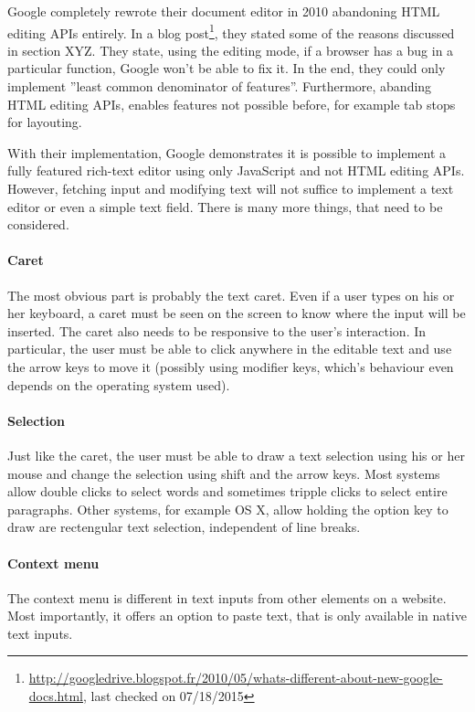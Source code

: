 Google completely rewrote their document editor in 2010 abandoning HTML editing APIs entirely. In a blog post\footnote{\url{http://googledrive.blogspot.fr/2010/05/whats-different-about-new-google-docs.html}, last checked on 07/18/2015}, they stated some of the reasons discussed in section XYZ. They state, using the editing mode, if a browser has a bug in a particular function, Google won't be able to fix it. In the end, they could only implement ''least common denominator of features''. Furthermore, abanding HTML editing APIs, enables features not possible before, for example tab stops for layouting. 

With their implementation, Google demonstrates it is possible to implement a fully featured rich-text editor using only JavaScript and not HTML editing APIs. However, fetching input and modifying text will not suffice to implement a text editor or even a simple text field. There is many more things, that need to be considered. 

\paragraph{Caret} The most obvious part is probably the text caret. Even if a user types on his or her keyboard, a caret must be seen on the screen to know where the input will be inserted. The caret also needs to be responsive to the user's interaction. In particular, the user must be able to click anywhere in the editable text and use the arrow keys to move it (possibly using modifier keys, which's behaviour even depends on the operating system used).

\paragraph{Selection} Just like the caret, the user must be able to draw a text selection using his or her mouse and change the selection using shift and the arrow keys. Most systems allow double clicks to select words and sometimes tripple clicks to select entire paragraphs. Other systems, for example OS X, allow holding the option key to draw are rectengular text selection, independent of line breaks.

\paragraph{Context menu} The context menu is different in text inputs from other elements on a website. Most importantly, it offers an option to paste text, that is only available in native text inputs.

